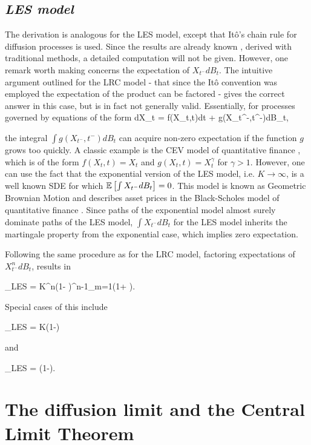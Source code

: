 \subsection*{\textit{LES model}}
The derivation is analogous for the LES model, except that It\^{o}'s chain rule for diffusion processes is used.  Since the results are already known \cite{engen2000}, derived with traditional methods, a detailed computation will not be given.  However, one remark worth making concerns the expectation of $X_{t^-}dB_t$.  The intuitive argument outlined for the LRC model - that since the It\^{o} convention was employed the expectation of the product can be factored - gives the correct answer in this case, but is in fact not generally valid.  Essentially, for processes governed by equations of the form 
\be
dX_t = f(X_t,t)dt + g(X_{t^-},t^-)dB_t,
\ee

\noindent the integral $\int g(X_{t^-},t^-)dB_t$ can acquire non-zero expectation if the function $g$ grows too quickly.  A classic example is the CEV model of quantitative finance \cite{linetsky2010constant}, which is of the form $f(X_t,t) = X_t$ and $g(X_t,t) = X^{\gamma}_t$ for $\gamma > 1$.  However, one can use the fact that the exponential version of the LES model, i.e. $K \to \infty$, is a well known SDE for which $\mathbb{E}\left[\int X_{t^-}dB_t\right]=0$.  This model is known as Geometric Brownian Motion and describes asset prices in the Black-Scholes model of quantitative finance \cite{linetsky2010constant}.  Since paths of the exponential model almost surely dominate paths of the LES model, $\int X_{t^-}dB_t$ for the LES model inherits the martingale property from the exponential case, which implies zero expectation.

Following the same procedure as for the LRC model, factoring expectations of $X^n_{t^-}dB_t$, results in

\be
\expec[X^n]_{LES} = K^{n}\left(1- \right)\prod^{n-1}_{m=1}\left(1+ \right).
\ee

\noindent Special cases of this include

\be
\expec[X]_{LES} = K\left(1-\right)
\ee

\noindent and

\be
\Var[X]_{LES} = \left(1-\right).
\ee



\section*{The diffusion limit and the Central Limit Theorem}

